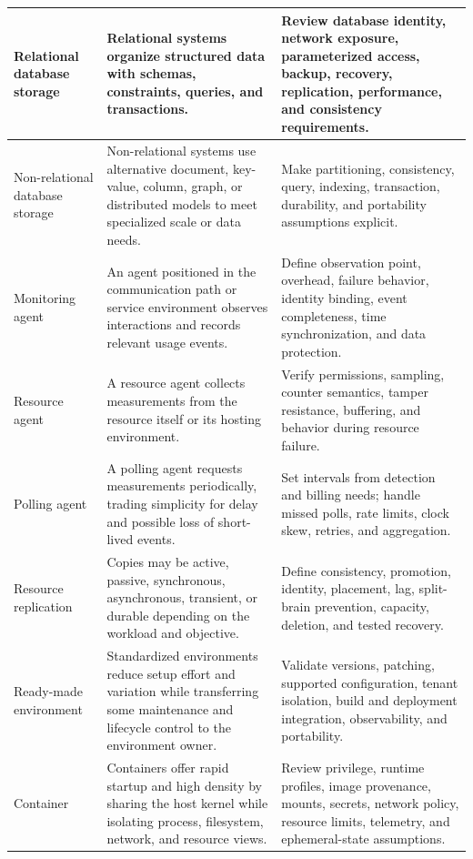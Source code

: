 \documentclass[11pt]{article}
\begin{document}
\begin{longtable}{@{}>{\RaggedRight\arraybackslash}p{}>{\RaggedRight\arraybackslash}p{}>{\RaggedRight\arraybackslash}p{}@{}}
Relational database storage & Relational systems organize structured data with schemas, constraints, queries, and transactions. & Review database identity, network exposure, parameterized access, backup, recovery, replication, performance, and consistency requirements. \\\midrule
Non-relational database storage & Non-relational systems use alternative document, key-value, column, graph, or distributed models to meet specialized scale or data needs. & Make partitioning, consistency, query, indexing, transaction, durability, and portability assumptions explicit. \\\midrule
Monitoring agent & An agent positioned in the communication path or service environment observes interactions and records relevant usage events. & Define observation point, overhead, failure behavior, identity binding, event completeness, time synchronization, and data protection. \\\midrule
Resource agent & A resource agent collects measurements from the resource itself or its hosting environment. & Verify permissions, sampling, counter semantics, tamper resistance, buffering, and behavior during resource failure. \\\midrule
Polling agent & A polling agent requests measurements periodically, trading simplicity for delay and possible loss of short-lived events. & Set intervals from detection and billing needs; handle missed polls, rate limits, clock skew, retries, and aggregation. \\\midrule
Resource replication & Copies may be active, passive, synchronous, asynchronous, transient, or durable depending on the workload and objective. & Define consistency, promotion, identity, placement, lag, split-brain prevention, capacity, deletion, and tested recovery. \\\midrule
Ready-made environment & Standardized environments reduce setup effort and variation while transferring some maintenance and lifecycle control to the environment owner. & Validate versions, patching, supported configuration, tenant isolation, build and deployment integration, observability, and portability. \\\midrule
Container & Containers offer rapid startup and high density by sharing the host kernel while isolating process, filesystem, network, and resource views. & Review privilege, runtime profiles, image provenance, mounts, secrets, network policy, resource limits, telemetry, and ephemeral-state assumptions. \\\midrule
\bottomrule
\end{longtable}
\endgroup
\end{document}
